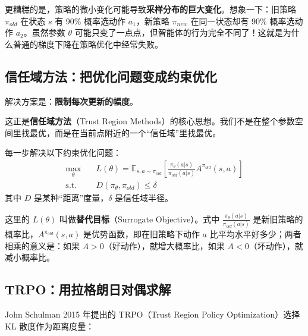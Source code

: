 更糟糕的是，策略的微小变化可能导致\textbf{采样分布的巨大变化}。想象一下：旧策略 $\pi_{old}$ 在状态 $s$ 有 90\% 概率选动作 $a_1$，新策略 $\pi_{new}$ 在同一状态却有 90\% 概率选动作 $a_2$。虽然参数 $\theta$ 可能只变了一点点，但智能体的行为完全不同了！这就是为什么普通的梯度下降在策略优化中经常失败。

\subsection{信任域方法：把优化问题变成约束优化}

解决方案是：\textbf{限制每次更新的幅度}。

这正是\textbf{信任域方法}（Trust Region Methods）的核心思想。我们不是在整个参数空间里找最优，而是在当前点附近的一个“信任域”里找最优。

\begin{keyidea}[信任域优化]
每一步解决以下约束优化问题：
\begin{equation}
    \begin{aligned}
        \max_\theta \quad & L(\theta) = \mathbb{E}_{s,a \sim \pi_{old}} \left[ \frac{\pi_\theta(a|s)}{\pi_{old}(a|s)} A^{\pi_{old}}(s,a) \right] \\
        \text{s.t.} \quad & D(\pi_\theta, \pi_{old}) \leq \delta
    \end{aligned}
\end{equation}
其中 $D$ 是某种“距离”度量，$\delta$ 是信任域半径。
\end{keyidea}

这里的 $L(\theta)$ 叫做\textbf{替代目标}（Surrogate Objective）。式中 $\frac{\pi_\theta(a|s)}{\pi_{old}(a|s)}$ 是新旧策略的概率比，$A^{\pi_{old}}(s,a)$ 是优势函数，即在旧策略下动作 $a$ 比平均水平好多少；两者相乘的意义是：如果 $A > 0$（好动作），就增大概率比，如果 $A < 0$（坏动作），就减小概率比。

\subsection{TRPO：用拉格朗日对偶求解}

John Schulman 2015 年提出的 TRPO（Trust Region Policy Optimization）选择 KL 散度作为距离度量：

